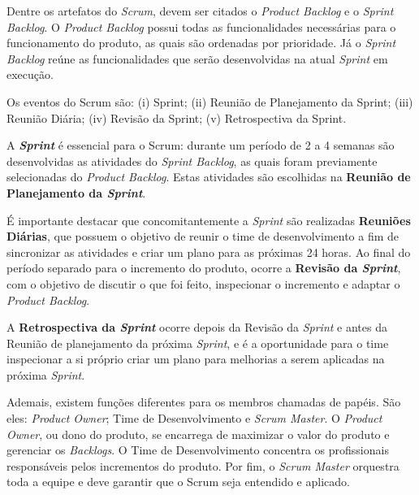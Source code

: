 Dentre os artefatos do \textit{Scrum}, devem ser citados o \textit{Product Backlog} e o \textit{Sprint Backlog}. O \textit{Product Backlog} possui todas as funcionalidades necessárias para o funcionamento do produto, as quais são ordenadas por prioridade. Já o \textit{Sprint Backlog} reúne as funcionalidades que serão desenvolvidas na atual \textit{Sprint} em execução.

Os eventos do Scrum são: (i) Sprint; (ii) Reunião de Planejamento da Sprint; (iii) Reunião Diária; (iv) Revisão da Sprint; (v) Retrospectiva da Sprint.

A \textbf{\textit{Sprint}} é essencial para o Scrum: durante um período de 2 a 4 semanas são desenvolvidas as atividades do \textit{Sprint Backlog}, as quais foram previamente selecionadas do \textit{Product Backlog}. Estas atividades são escolhidas na \textbf{Reunião de Planejamento da \textit{Sprint}}. 

É importante destacar que concomitantemente a \textit{Sprint} são realizadas \textbf{Reuniões Diárias}, que possuem o objetivo de reunir o time de desenvolvimento a fim de sincronizar as atividades e criar um plano para as próximas 24 horas. Ao final do período separado para o incremento do produto, ocorre a \textbf{Revisão da \textit{Sprint}}, com o objetivo de discutir o que foi feito, inspecionar o incremento e adaptar o \textit{Product Backlog}. 

A \textbf{Retrospectiva da \textit{Sprint}} ocorre depois da Revisão da \textit{Sprint} e antes da Reunião de planejamento da próxima \textit{Sprint}, e é a oportunidade para o time inspecionar a si próprio criar um plano para melhorias a serem aplicadas na próxima \textit{Sprint}.

Ademais, existem funções diferentes para os membros chamadas de papéis. São eles: \textit{Product Owner}; Time de Desenvolvimento e \textit{Scrum Master}. 
O \textit{Product Owner}, ou dono do produto, se encarrega de maximizar o valor do produto e gerenciar os \textit{Backlogs}. O Time de Desenvolvimento concentra os profissionais responsáveis pelos incrementos do produto. Por fim, o \textit{Scrum Master} orquestra toda a equipe e deve garantir que o Scrum seja entendido e aplicado.

